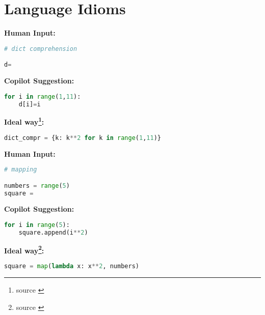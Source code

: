 \section{Language Idioms}

\begin{tcolorbox}[title=Dict Comprehension,boxsep=.5mm]
\textbf{Human Input:}
\begin{lstlisting}[language=Python]
# dict comprehension

d=
\end{lstlisting}
\tcbline
\textbf{Copilot Suggestion:}
\begin{lstlisting}[language=Python,escapechar=\%]
% \noindent\textcolor{gray}{d  =} % []
for i in range(1,11):
    d[i]=i
\end{lstlisting}
\tcbline
\textbf{Ideal way\footnote{source \cite{Alexandru2018}}:}
\begin{lstlisting}[language=Python]
dict_compr = {k: k**2 for k in range(1,11)}
\end{lstlisting}
\end{tcolorbox}


\begin{tcolorbox}[title=Mapping,boxsep=.5mm]
\textbf{Human Input:}
\begin{lstlisting}[language=Python]
# mapping

numbers = range(5)
square = 
\end{lstlisting}
\tcbline
\textbf{Copilot Suggestion:}
\begin{lstlisting}[language=Python,escapechar=\%]
% \noindent\textcolor{gray}{square = []} % []
for i in range(5):
    square.append(i**2)
\end{lstlisting}
\tcbline
\textbf{Ideal way\footnote{source \cite{Alexandru2018}}:}
\begin{lstlisting}[language=Python]
square = map(lambda x: x**2, numbers)
\end{lstlisting}
\end{tcolorbox}


